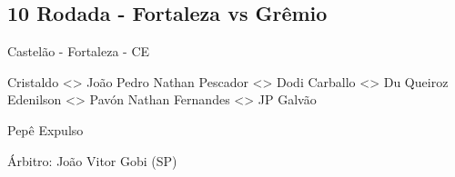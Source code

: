 \newpage
\subsection{10 Rodada - Fortaleza vs Grêmio}

\begin{figure}[H]
    \centering
    
\end{figure}

Castelão - Fortaleza - CE

Cristaldo <> João Pedro
Nathan Pescador <> Dodi
Carballo <> Du Queiroz
Edenilson <> Pavón
Nathan Fernandes <> JP Galvão

Pepê Expulso

Árbitro: João Vitor Gobi (SP)